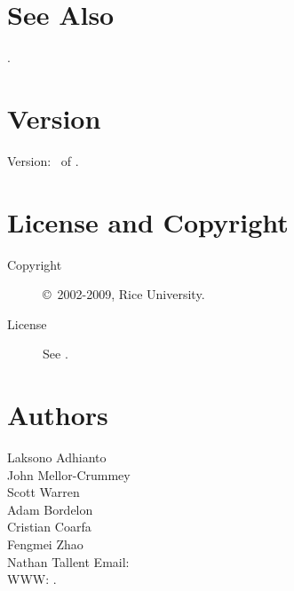 \documentclass[english]{article}
\begin{document}
\section{See Also}

.

\section{Version}

Version: \Version\ of \Date.

\section{License and Copyright}

\begin{description}
\item[Copyright] \copyright\ 2002-2009, Rice University.
\item[License] See .
\end{description}

\section{Authors}

\noindent
Laksono Adhianto \\
John Mellor-Crummey \\
Scott Warren \\
Adam Bordelon \\
Cristian Coarfa \\
Fengmei Zhao \\
Nathan Tallent
Email:  \\
WWW: .

\LatexManEnd
\end{document}
